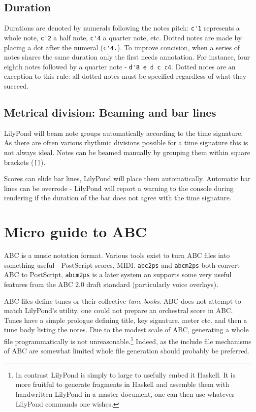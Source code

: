 \documentclass{article}
\begin{document}
\subsection{Duration}
Durations are denoted by numerals following the notes pitch:
\verb+c'1+ represents a whole note, \verb+c'2+ a half note, 
\verb+c'4+ a quarter note, etc. Dotted notes are made by placing 
a dot after the numeral (\verb+c'4.+). To improve concision, 
when a series of notes shares the same duration only the first 
needs annotation. For instance, four eighth notes followed by a 
quarter note - \verb+d'8 e d c c4+. Dotted notes are an exception 
to this rule: all dotted notes must be specified regardless of
what they succeed.

\subsection{Metrical division: Beaming and bar lines}
LilyPond will beam note groups automatically according to the 
time signature. As there are often various rhythmic divisions 
possible for a time signature this is not always ideal. Notes 
can be beamed manually by grouping them within square brackets 
(\verb+[]+).

Scores can elide bar lines, LilyPond will place them 
automatically. Automatic bar lines can be overrode - LilyPond 
will report a warning to the console during rendering if the 
duration of the bar does not agree with the time signature.


\section{Micro guide to ABC}
ABC is a music notation format. Various tools exist to turn ABC 
files into something useful - PostScript scores, MIDI. 
\verb+abc2ps+ and \verb+abcm2ps+ both convert ABC to PostScript, 
\verb+abcm2ps+ is a later system an supports some very useful 
features from the ABC 2.0 draft standard (particularly voice 
overlays). 

ABC files define tunes or their collective \emph{tune-books}. ABC 
does not attempt to match LilyPond's utility, one could not 
prepare an orchestral score in ABC. Tunes have a simple prologue
defining title, key signature, meter etc. and then a tune body
listing the notes. Due to the modest scale of ABC, generating a
whole file programmatically is not unreasonable.\footnote{In 
contrast LilyPond is simply to large to usefully embed it 
Haskell. It is more fruitful to generate fragments in Haskell 
and assemble them with handwritten LilyPond in a master document, 
one can then use whatever LilyPond commands one wishes.} Indeed, 
as the include file mechanisms of ABC are somewhat limited whole 
file generation should probably be preferred.
\end{document}
